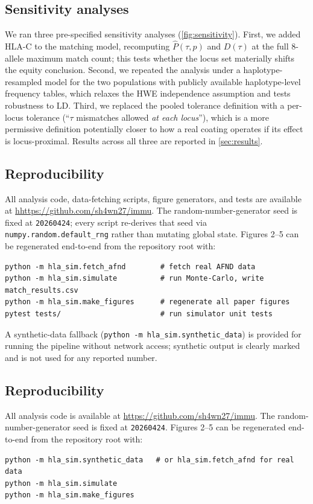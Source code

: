 \documentclass[11pt]{article}
\begin{document}
\subsection{Sensitivity analyses}
We ran three pre-specified sensitivity analyses (\cref{fig:sensitivity}). First, we added HLA-C to the matching model, recomputing $\hat{P}(\tau, p)$ and $D(\tau)$ at the full 8-allele maximum match count; this tests whether the locus set materially shifts the equity conclusion. Second, we repeated the analysis under a haplotype-resampled model for the two populations with publicly available haplotype-level frequency tables, which relaxes the HWE independence assumption and tests robustness to LD. Third, we replaced the pooled tolerance definition with a per-locus tolerance (``$\tau$ mismatches allowed \emph{at each locus}''), which is a more permissive definition potentially closer to how a real coating operates if its effect is locus-proximal. Results across all three are reported in \cref{sec:results}.

\subsection{Reproducibility}
All analysis code, data-fetching scripts, figure generators, and tests are available at \url{hhttps://github.com/sh4wn27/immu}. The random-number-generator seed is fixed at \texttt{20260424}; every script re-derives that seed via \texttt{numpy.random.default\_rng} rather than mutating global state. Figures 2--5 can be regenerated end-to-end from the repository root with:
\begin{verbatim}
python -m hla_sim.fetch_afnd        # fetch real AFND data
python -m hla_sim.simulate          # run Monte-Carlo, write match_results.csv
python -m hla_sim.make_figures      # regenerate all paper figures
pytest tests/                       # run simulator unit tests
\end{verbatim}
A synthetic-data fallback (\texttt{python -m hla\_sim.synthetic\_data}) is provided for running the pipeline without network access; synthetic output is clearly marked and is not used for any reported number.

\subsection{Reproducibility}
All analysis code is available at \url{https://github.com/sh4wn27/immu}. The random-number-generator seed is fixed at \texttt{20260424}. Figures 2--5 can be regenerated end-to-end from the repository root with:
\begin{verbatim}
python -m hla_sim.synthetic_data   # or hla_sim.fetch_afnd for real data
python -m hla_sim.simulate
python -m hla_sim.make_figures
\end{verbatim}
\end{document}

